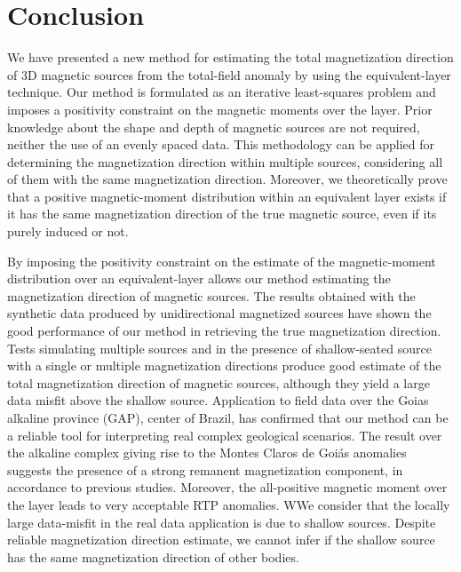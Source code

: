 \section{Conclusion}
\label{sec:conclusion}

We have presented a new method for estimating the total magnetization direction of 3D magnetic sources from the total-field anomaly by using the equivalent-layer technique. Our method is formulated as an iterative least-squares problem and imposes a positivity constraint on the magnetic moments over the layer. Prior knowledge about the shape and depth of magnetic sources are not required, neither the use of an evenly spaced data. This methodology can be applied for determining the magnetization direction within multiple sources, considering all of them with the same magnetization direction. Moreover, we theoretically prove that a positive magnetic-moment distribution within an equivalent layer exists if it has the same magnetization direction of the true magnetic source, even if its purely induced or not.

By imposing the positivity constraint on the estimate of the magnetic-moment distribution over an equivalent-layer allows our method estimating the magnetization direction of magnetic sources. The results obtained with the synthetic data produced by unidirectional magnetized sources have shown the good performance of our method in retrieving the true magnetization direction. Tests simulating multiple sources and in the presence of shallow-seated source with a single or multiple magnetization directions produce good estimate of the total magnetization direction of magnetic sources, although they yield a large data misfit above the shallow source. Application to field data over the Goias alkaline province (GAP), center of Brazil, has confirmed that our method can be a reliable tool for interpreting real complex geological scenarios. The result over the alkaline complex giving rise to the Montes Claros de Goi\'as anomalies suggests the presence of a strong remanent magnetization component, in accordance to previous studies. Moreover, the all-positive magnetic moment over the layer leads to very acceptable RTP anomalies. WWe consider that the locally large data-misfit in the real data application is due to shallow sources. Despite reliable magnetization direction estimate, we cannot infer if the shallow source has the same magnetization direction of other bodies.   
